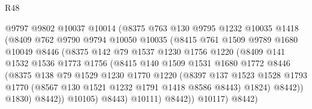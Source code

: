 \begin{lexlean}{R48}
\begin{coremodule}
                        @9797
                        @9802
                        @10037
                        @10014
                        (@8375
                          @763
                          @130
                          @9795
                          @1232
                          @10035
                          @1418
                          (@8409
                            @762
                            @9790
                            @9794
                            @10050
                            @10035
                            (@8415
                              @761
                              @1509
                              @9789
                              @1680
                              @10049
                              @8446
                              (@8375
                                @142
                                @79
                                @1537
                                @1230
                                @1756
                                @1220
                                (@8409
                                  @141
                                  @1532
                                  @1536
                                  @1773
                                  @1756
                                  (@8415
                                    @140
                                    @1509
                                    @1531
                                    @1680
                                    @1772
                                    @8446
                                    (@8375
                                      @138
                                      @79
                                      @1529
                                      @1230
                                      @1770
                                      @1220
                                      (@8397
                                        @137
                                        @1523
                                        @1528
                                        @1793
                                        @1770
                                        (@8567 @130 @1521 @1232 @1791 @1418 @8586 @8443)
                                        @1824)
                                      @8442))
                                  @1830)
                                @8442))
                            @10105)
                          @8443)
                        @10111)
                      @8442))
                  @10117)
                @8442)

\end{coremodule}
\end{lexlean}
